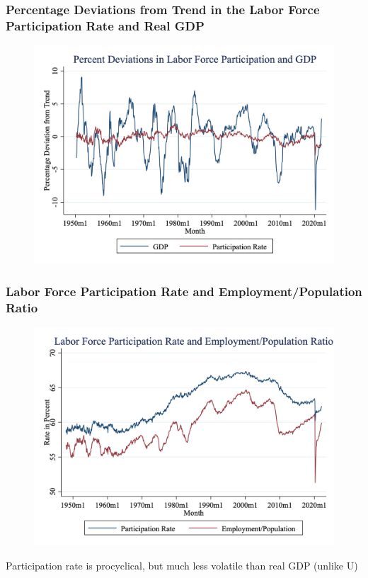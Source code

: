 \documentclass{beamer}
\begin{document}
\begin{frame}
\frametitle[alignment=center]{Percentage Deviations from Trend in the Labor Force Participation Rate and Real GDP}
\begin{figure}
\centering
\includegraphics[scale=0.2]{Figures/Fig_6pt5.png}
\end{figure}
\end{frame}

\begin{frame}
\frametitle[alignment=center]{Labor Force Participation Rate and Employment/Population Ratio}
\begin{figure}
\centering
\includegraphics[scale=0.20]{Figures/Fig_6pt6.png}
\end{figure}
Participation rate is procyclical, but much less volatile than real GDP (unlike U)
\end{frame}
\end{document}
